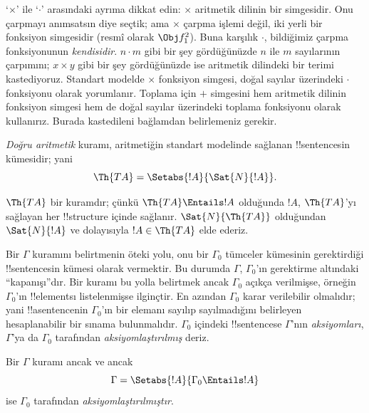 `$\times$' ile `$\cdot$' arasındaki ayrıma dikkat edin: $\times$ aritmetik
dilinin bir simgesidir. Onu çarpmayı anımsatsın diye seçtik; ama $\times$
çarpma işlemi değil, iki yerli bir fonksiyon simgesidir (resmî olarak
$\Obj f^2_1$). Buna karşılık $\cdot$, bildiğimiz çarpma fonksiyonunun
\emph{kendisidir}. $n \cdot m$ gibi bir şey gördüğünüzde $n$ ile $m$
sayılarının çarpımını; $x \times y$ gibi bir şey gördüğünüzde ise aritmetik
dilindeki bir terimi kastediyoruz. Standart modelde $\times$ fonksiyon
simgesi, doğal sayılar üzerindeki $\cdot$ fonksiyonu olarak yorumlanır.
Toplama için $+$ simgesini hem aritmetik dilinin fonksiyon simgesi hem de
doğal sayılar üzerindeki toplama fonksiyonu olarak kullanırız. Burada
kastedileni bağlamdan belirlemeniz gerekir.

\begin{defn}
\emph{Doğru aritmetik} kuramı, aritmetiğin standart modelinde sağlanan
!!{sentence}s{}in kümesidir; yani
\[
\Th{TA} = \Setabs{!A}{\Sat{N}{!A}}.
\]
\end{defn}

$\Th{TA}$ bir kuramdır; çünkü $\Th{TA} \Entails !A$ olduğunda $!A$,
$\Th{TA}$'yı sağlayan her !!{structure} içinde sağlanır. $\Sat{N}{\Th{TA}}$
olduğundan $\Sat{N}{!A}$ ve dolayısıyla $!A \in \Th{TA}$ elde ederiz.

Bir $\Gamma$ kuramını belirtmenin öteki yolu, onu bir $\Gamma_0$ tümceler
kümesinin gerektirdiği !!{sentence}s{}in kümesi olarak vermektir. Bu durumda
$\Gamma$, $\Gamma_0$'ın gerektirme altındaki ``kapanışı''dır. Bir kuramı
bu yolla belirtmek ancak $\Gamma_0$ açıkça verilmişse, örneğin
$\Gamma_0$'ın !!{element}s{}ı listelenmişse ilginçtir. En azından
$\Gamma_0$ karar verilebilir olmalıdır; yani !!a{sentence}{}nin
$\Gamma_0$'ın bir elemanı sayılıp sayılmadığını belirleyen hesaplanabilir
bir sınama bulunmalıdır. $\Gamma_0$ içindeki !!{sentence}s{}e $\Gamma$'nın
\emph{aksiyomları}, $\Gamma$'ya da $\Gamma_0$ tarafından
\emph{aksiyomlaştırılmış} deriz.

\begin{defn}
Bir $\Gamma$ kuramı ancak ve ancak
\[
\Gamma = \Setabs{!A}{\Gamma_0 \Entails !A}
\]
ise $\Gamma_0$ tarafından \emph{aksiyomlaştırılmıştır}.
\end{defn}

